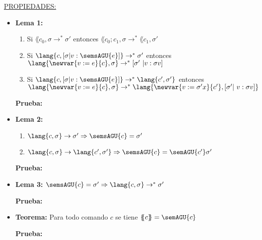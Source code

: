       \underline{PROPIEDADES:}
      \begin{itemize}
        \item \textbf{Lema 1:}
          \begin{enumerate}
            \item Si $\lang{c_0, \sigma} \rightarrow^{\ast} \sigma'$ entonces $\lang{c_0;c_1, \sigma} \rightarrow^{\ast} \lang{c_1, \sigma'}$
            \item Si $\lang{c, [\sigma | v : \semsAGU{e}]} \rightarrow^{\ast} \sigma'$ entonces $\lang{\newvar{v := e}{c}, \sigma} \rightarrow^{\ast} [\sigma' | v : \sigma v]$
            \item Si $\lang{c, [\sigma | v : \semsAGU{e}]} \rightarrow^{\ast} \lang{c', \sigma'}$ entonces $\lang{\newvar{v := e}{c}, \sigma} \rightarrow^{\ast} \lang{\newvar{v := \sigma' x}{c'}, [\sigma' | v : \sigma v]}$
          \end{enumerate}
          
          \PN \textbf{Prueba:}

        \item \textbf{Lema 2:}
          \begin{enumerate}
            \item $\lang{c, \sigma} \rightarrow \sigma' \Rightarrow \semsAGU{c} = \sigma'$
            \item $\lang{c, \sigma} \rightarrow \lang{c', \sigma'} \Rightarrow \semsAGU{c} = \semAGU{c'}\sigma'$
          \end{enumerate}

          \PN \textbf{Prueba:}

        \item \textbf{Lema 3:} $\semsAGU{c} = \sigma' \Rightarrow \lang{c, \sigma} \rightarrow^{\ast} \sigma'$
          
          \PN \textbf{Prueba:}

        \item \textbf{Teorema:} Para todo comando $c$ se tiene $\{\!\!\{c\}\!\!\} = \semAGU{c}$
          
          \PN \textbf{Prueba:}

      \end{itemize}